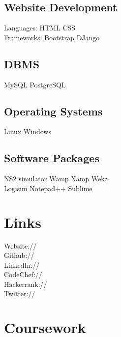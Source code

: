 \documentclass[]{resume-openfont}
\begin{document}
\begin{minipage}[t]{0.33\textwidth}
\subsection{Website Development}
Languages: HTML \textbullet{} CSS \\
Frameworks: Bootstrap \textbullet{} DJango
\sectionsep
\subsection{DBMS}
MySQL \textbullet{} PostgreSQL
\sectionsep
\subsection{Operating Systems}
Linux \textbullet{} Windows
\sectionsep
\subsection{Software Packages}
NS2 simulator \textbullet{} Wamp \textbullet{} Xamp \textbullet{} Weka \\ Logisim \textbullet{} Notepad++ \textbullet{} Sublime 
\sectionsep



\section{Links}
Website:// \href{https://diksha-rathi.github.io}{} \\
Github:// \href{https://github.com/Diksha-Rathi}{} \\
LinkedIn://  \href{https://www.linkedin.com/in/diksharathi}{} \\
CodeChef://  \href{https://www.codechef.com/users/codegirl1995}{} \\
Hackerrank://  \href{https://www.hackerrank.com/codegirl1995}{} \\
Twitter://  \href{https://twitter.com/diksha_28795}{} \\
\sectionsep


\section{Coursework}

\end{minipage}
\end{document}
